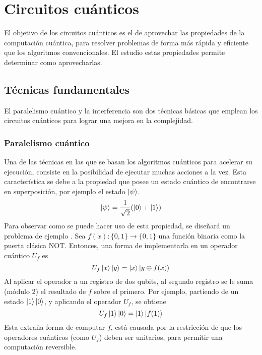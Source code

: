 \chapter{Circuitos cuánticos}
El objetivo de los circuitos cuánticos es el de aprovechar las propiedades de la 
computación cuántica, para resolver problemas de forma más rápida y eficiente 
que los algoritmos convencionales. El estudio estas propiedades permite 
determinar como aprovecharlas.

\section{Técnicas fundamentales}
El paralelismo cuántico y la interferencia son dos técnicas básicas que emplean 
los circuitos cuánticos para lograr una mejora en la complejidad.

\subsection{Paralelismo cuántico}
Una de las técnicas en las que se basan los algoritmos cuánticos para acelerar 
su ejecución, consiste en la posibilidad de ejecutar muchas acciones a la vez.  
Esta característica se debe a la propiedad que posee un estado cuántico de 
encontrarse en superposición, por ejemplo el estado $\ket{\psi}$.
%
$$ \ket{\psi} = \frac{1}{\sqrt 2}(\ket{0} + \ket{1}) $$
%
Para observar como se puede hacer uso de esta propiedad, se diseñará un problema 
de ejemplo \cite{nielsen00}. Sea $f(x): \{0,1\} \rightarrow \{0,1\}$ una función 
binaria como la puerta clásica NOT. Entonces, una forma de implementarla en un 
operador cuántico $U_f$ es
%
$$ U_f \ket{x}\ket{y} = \ket{x}\ket{y \oplus f(x)} $$
%
Al aplicar el operador a un registro de dos qubits, al segundo registro se le 
suma (módulo 2) el resultado de $f$ sobre el primero. Por ejemplo, partiendo de 
un estado $\ket{1}\ket{0}$, y aplicando el operador $U_f$, se obtiene
%
$$ U_f \ket{1}\ket{0} = \ket{1}\ket{f(1)} $$
%
Esta extraña forma de computar $f$, está causada por la restricción de que los 
operadores cuánticos (como $U_f$) deben ser unitarios, para permitir una 
computación reversible.

